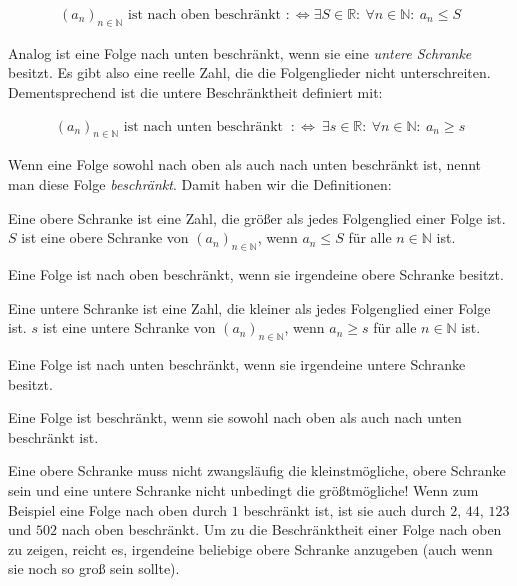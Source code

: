 \documentclass[fontsize=9pt,
               parskip=half-,
               DIV=14,
               listof=chapterentry,
               tocflat]{scrbook}
\begin{document}
\begin{align*}
\left(a_{n}\right)_{n\in \mathbb {N} }{\text{ ist nach oben beschränkt }}:\iff \exists S\in \mathbb {R} :\ \forall n\in \mathbb {N} :\ a_{n}\leq S
\end{align*}

Analog ist eine Folge nach unten beschränkt, wenn sie eine \emph{untere Schranke} besitzt. Es gibt also eine reelle Zahl, die die Folgenglieder nicht unterschreiten. Dementsprechend ist die untere Beschränktheit definiert mit:

\begin{align*}
\left(a_{n}\right)_{n\in \mathbb {N} }{\text{ ist nach unten beschränkt }}\ :\iff \ \exists s\in \mathbb {R} :\ \forall n\in \mathbb {N} :\ a_{n}\geq s
\end{align*}

Wenn eine Folge sowohl nach oben als auch nach unten beschränkt ist, nennt man diese Folge \emph{beschränkt}. Damit haben wir die Definitionen:

\begin{description}[style=nextline]
\item[obere Schranke]
Eine obere Schranke ist eine Zahl, die größer als jedes Folgenglied einer Folge ist. $S$ ist eine obere Schranke von $(a_{n})_{n\in \mathbb {N} }$, wenn $a_{n}\leq S$ für alle $n\in \mathbb {N} $ ist.\item[nach oben beschränkte Folge]
Eine Folge ist nach oben beschränkt, wenn sie irgendeine obere Schranke besitzt.\item[untere Schranke]
Eine untere Schranke ist eine Zahl, die kleiner als jedes Folgenglied einer Folge ist. $s$ ist eine untere Schranke von $(a_{n})_{n\in \mathbb {N} }$, wenn $a_{n}\geq s$ für alle $n\in \mathbb {N} $ ist.\item[nach unten beschränkte Folge]
Eine Folge ist nach unten beschränkt, wenn sie irgendeine untere Schranke besitzt.\item[beschränkte Folge]
Eine Folge ist beschränkt, wenn sie sowohl nach oben als auch nach unten beschränkt ist.\end{description}

\begin{hint*}
Eine obere Schranke muss nicht zwangsläufig die kleinstmögliche, obere Schranke sein und eine untere Schranke nicht unbedingt die größtmögliche! Wenn zum Beispiel eine Folge nach oben durch $1$ beschränkt ist, ist sie auch durch $2$, $44$, $123$ und $502$ nach oben beschränkt. Um zu die Beschränktheit einer Folge nach oben zu zeigen, reicht es, irgendeine beliebige obere Schranke anzugeben (auch wenn sie noch so groß sein sollte).

\end{hint*}
\end{document}
